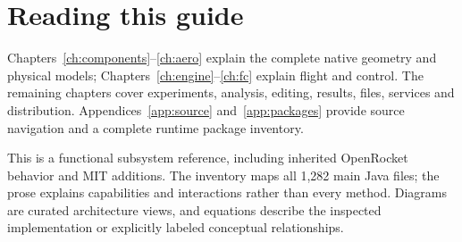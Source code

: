 \section{Reading this guide}
Chapters~\ref{ch:components}--\ref{ch:aero} explain the complete native geometry and physical models; Chapters~\ref{ch:engine}--\ref{ch:fc} explain flight and control. The remaining chapters cover experiments, analysis, editing, results, files, services and distribution. Appendices~\ref{app:source} and~\ref{app:packages} provide source navigation and a complete runtime package inventory.

This is a functional subsystem reference, including inherited OpenRocket behavior and MIT additions. The inventory maps all 1,282 main Java files; the prose explains capabilities and interactions rather than every method. Diagrams are curated architecture views, and equations describe the inspected implementation or explicitly labeled conceptual relationships.
